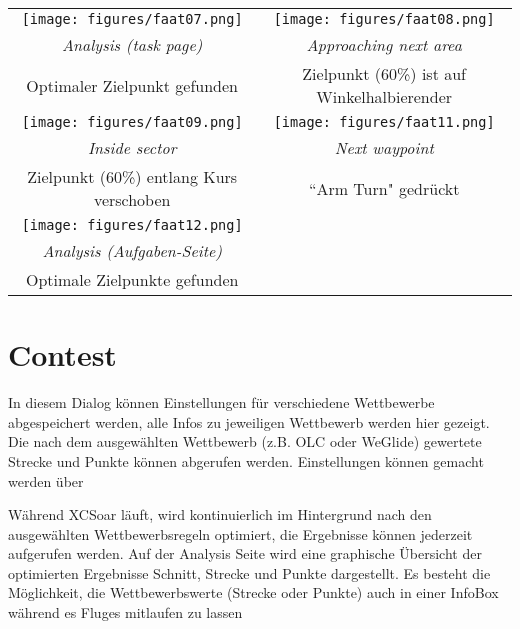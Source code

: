 \begin{maxipage}
\begin{center}
\begin{longtable}{|c|c|}
\toprule
\texttt{[image: figures/faat07.png]} &
\texttt{[image: figures/faat08.png]} \\
{\em Analysis (task page)} & {\em Approaching next area} \\
Optimaler Zielpunkt gefunden & Zielpunkt (60\%) ist auf Winkelhalbierender\\

\midrule
\texttt{[image: figures/faat09.png]} &
\texttt{[image: figures/faat11.png]} \\
{\em Inside sector} & {\em Next waypoint} \\
Zielpunkt (60\%) entlang Kurs verschoben & ``Arm Turn" gedrückt\\

\midrule
\texttt{[image: figures/faat12.png]} &  \\
{\em Analysis (Aufgaben-Seite)} &  \\
Optimale Zielpunkte gefunden  & \\

\bottomrule
\end{longtable}
\end{center}
\end{maxipage}

\section{Contest}

In diesem Dialog können Einstellungen für verschiedene Wettbewerbe abgespeichert werden, alle Infos zu jeweiligen Wettbewerb werden hier gezeigt. Die nach dem ausgewählten Wettbewerb (z.B. OLC oder WeGlide) gewertete Strecke und Punkte können abgerufen werden. Einstellungen können gemacht werden über   

Während \textsf{XCSoar} läuft, wird kontinuierlich im Hintergrund nach den ausgewählten Wettbewerbsregeln optimiert, die Ergebnisse können  jederzeit  aufgerufen werden.
Auf der Analysis Seite wird eine graphische Übersicht der optimierten Ergebnisse Schnitt, Strecke und Punkte dargestellt.  Es besteht die Möglichkeit, die Wettbewerbswerte (Strecke oder Punkte) auch in einer InfoBox während es Fluges mitlaufen zu lassen

